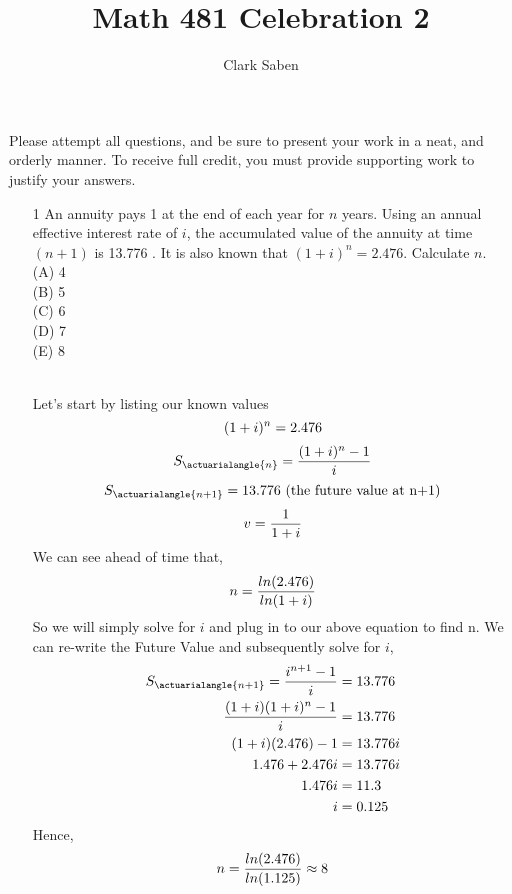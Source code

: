 \documentclass[10pt]{article}
\title{Math 481 Celebration 2}
\author{Clark Saben}
\date{}
\begin{document}
\maketitle
Please attempt all questions, and be sure to present your work in a neat, and orderly manner. To receive full credit, you must provide supporting work to justify your answers.

\begin{enumerate}
  \item [1] An annuity pays 1 at the end of each year for $n$ years. Using an annual effective interest rate of $i$, the accumulated value of the annuity at time $(n+1)$ is 13.776 . It is also known that $(1+i)^{n}=2.476$. Calculate $n$.\\

(A) 4\\
(B) 5\\
(C) 6\\
(D) 7\\
(E) 8\\

\\

\pagebreak

Let's start by listing our known values
$$
(1+i)^n = 2.476\\
$$
$$
S_{\actuarialangle{n}} = \frac{(1+i)^n - 1}{i}\\
$$
$$
S_{\actuarialangle{n+1}} = 13.776 \text{ (the future value at n+1)}\\
$$
$$
v = \frac{1}{1+i}\\
$$
We can see ahead of time that,
$$
n = \frac{ln(2.476)}{ln(1+i)}\\
$$
So we will simply solve for $i$ and plug in to our above equation to find n. We can re-write the
Future Value and subsequently solve for $i$,
\begin{align*}
	{S_{\actuarialangle{n+1}} = \frac{i^{n+1}-1}{i}} &= 13.776\\
	\frac{(1+i)(1+i)^n -1}{i} &= 13.776\\
	(1+i)(2.476) - 1&= 13.776i\\
	1.476 +2.476i &= 13.776i\\
	1.476i &= 11.3\\
	i &= 0.125\\
\end{align*}
Hence, 
$$
n = \frac{ln(2.476)}{ln(1.125)} \approx 8\\
$$

\\


\end{enumerate}
\end{document}

